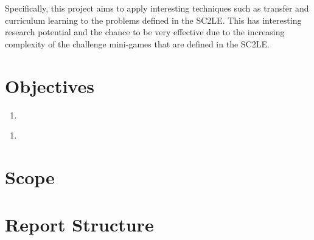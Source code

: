 Specifically, this project aims to apply interesting techniques such as
transfer and curriculum learning to the problems defined in the SC2LE\@.
This has interesting research potential and the chance to be very effective
due to the increasing complexity of the challenge mini-games that are defined
in the SC2LE\@.

\section{Objectives}

\begin{enumerate}
    \item
\end{enumerate}

\begin{enumerate}
    \item
\end{enumerate}

\section{Scope}

\section{Report Structure}
